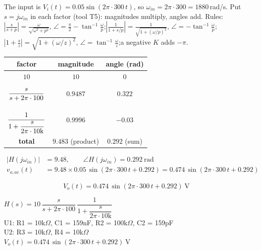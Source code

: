 \documentclass[11pt]{article}
\begin{document}
The input is $V_i(t) = 0.05\sin\left(2\pi\cdot 300\,t\right)$, so $\omega_{in} = 2\pi\cdot 300 = 1880$\,rad/s. Put $s=j\omega_{in}$ in each factor (tool T5): magnitudes multiply, angles add.
{\small Rules: $\left|\frac{s}{s+p}\right| = \frac{\omega}{\sqrt{\omega^2+p^2}}$, $\angle = \frac{\pi}{2}-\tan^{-1}\frac{\omega}{p}$;\quad $\left|\frac{1}{1+s/p}\right| = \frac{1}{\sqrt{1+(\omega/p)^2}}$, $\angle = -\tan^{-1}\frac{\omega}{p}$;\quad $\left|1+\frac{s}{z}\right| = \sqrt{1+(\omega/z)^2}$, $\angle = \tan^{-1}\frac{\omega}{z}$;\quad a negative $K$ adds $-\pi$.}
\begin{center}\renewcommand{\arraystretch}{1.35}
\begin{tabular}{ccc}
\toprule
factor & magnitude & angle (rad) \\
\midrule
$10$ & $10$ & $0$ \\
$\rule[-1.1em]{0pt}{2.8em}\dfrac{s}{s+2\pi\cdot 100}$ & $0.9487$ & $0.322$ \\
$\rule[-1.7em]{0pt}{4em}\dfrac{1}{1+\dfrac{s}{2\pi\cdot 10\mathrm{k}}}$ & $0.9996$ & $-0.03$ \\
\textbf{total} & $\mathbf{9.483}$ (product) & $\mathbf{0.292}$ (sum) \\
\bottomrule
\end{tabular}\end{center}

\begin{align*}
|H(j\omega_{in})| &= 9.48, \qquad \angle H(j\omega_{in}) = 0.292\ \mathrm{rad} \\
v_{o,ac}(t) &= 9.48\times 0.05\,\sin\left(2\pi\cdot 300\,t + 0.292\right) = 0.474\,\sin\left(2\pi\cdot 300\,t + 0.292\right)
\end{align*}

\[
\boxed{V_o(t) = 0.474\,\sin\left(2\pi\cdot 300\,t + 0.292\right)\ \mathrm{V}}
\]

\begin{ansbox}
$H(s) = 10\,\dfrac{s}{s+2\pi\cdot 100}\,\dfrac{1}{1+\dfrac{s}{2\pi\cdot 10\mathrm{k}}}$\\[4pt]
U1: R1 = 10k$\Omega$, C1 = 159nF, R2 = 100k$\Omega$, C2 = 159pF\\
U2: R3 = 10k$\Omega$, R4 = 10k$\Omega$\\[4pt]
$V_o(t) = 0.474\,\sin\left(2\pi\cdot 300\,t + 0.292\right)\ \mathrm{V}$
\end{ansbox}

\newpage
\end{document}
